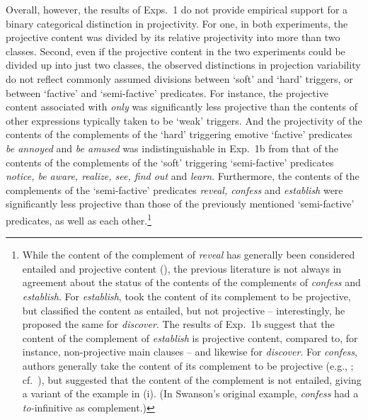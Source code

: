 \documentclass[11pt,fleqn]{article}
\newcommand{\6}{\mbox{$[\hspace*{-.6mm}[$}}
\newcommand{\9}{\mbox{$]\hspace*{-.6mm}]$}}
\begin{document}
Overall, however, the results of Exps.~1 do not provide empirical support for a binary categorical distinction in projectivity. For one, in both experiments, the projective content was divided by its relative projectivity into more than two classes. Second, even if the projective content in the two experiments could be divided up into just two classes, the observed distinctions in projection variability do not reflect commonly assumed divisions between `soft' and `hard' triggers, or between `factive' and `semi-factive' predicates. For instance, the projective content associated with {\em only} was significantly less projective than the contents of other expressions typically taken to be `weak' triggers. And the projectivity of the contents of the complements of the `hard' triggering emotive `factive' predicates {\em be annoyed} and {\em be amused} was indistinguishable in Exp.~1b from that of the contents of the complements of the `soft' triggering `semi-factive' predicates {\em notice, be aware, realize, see, find out} and {\em learn}. Furthermore, the contents of the complements of the `semi-factive' predicates {\em reveal, confess} and {\em establish} were significantly less projective than those of the previously mentioned `semi-factive' predicates, as well as each other.\footnote{While the content of the complement of {\em reveal} has generally been considered entailed and projective content (\citealt{hooper1974,melvold1991}), the previous literature is not always in agreement about the status of the contents of the complements of {\em confess} and {\em establish}. For {\em establish}, \citet{wyse} took the content of its complement to be projective, but \citet{swanson2012} classified the content as entailed, but not projective -- interestingly, he proposed the same for {\em discover}. The results of Exp.~1b suggest that the content of the complement of {\em establish} is projective content, compared to, for instance, non-projective main clauses -- and likewise for {\em discover}. For {\em confess}, authors generally take the content of its complement to be projective (e.g., \citealt{reis1973,melvold1991,schultz2003,swanson2012,karttunen2016}; cf.\ \citealt{wyse}), but \citet{swanson2012} suggested that the content of the complement is not entailed, giving a variant of the example in (i). (In Swanson's original example, {\em confess} had a {\em to-}infinitive as complement.)

}
\end{document}
